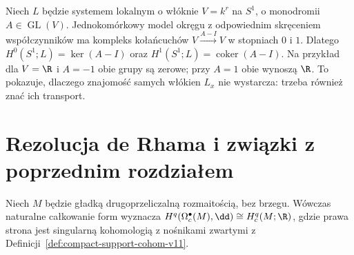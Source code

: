 \begin{przyklad}
Niech $L$ będzie systemem lokalnym o włóknie $V=k^r$
na $S^1$, o monodromii $A\in\operatorname{GL}(V)$.
Jednokomórkowy model okręgu z odpowiednim skręceniem
współczynników ma kompleks kołańcuchów
$V\xrightarrow{A-I}V$ w stopniach $0$ i $1$.
Dlatego
$H^0(S^1;L)=\ker(A-I)$ oraz
$H^1(S^1;L)=\operatorname{coker}(A-I)$.
Na przykład dla $V=\R$ i $A=-1$ obie grupy są zerowe;
przy $A=1$ obie wynoszą $\R$.
To pokazuje, dlaczego znajomość samych włókien $L_x$
nie wystarcza: trzeba również znać ich transport.
\end{przyklad}

\section{Rezolucja de Rhama i związki z poprzednim rozdziałem}
\begin{twierdzenie}
\label{thm:de-rham-sheaf-v12}
Niech $M$ będzie gładką drugoprzeliczalną rozmaitością,
bez brzegu. Wówczas naturalne całkowanie form wyznacza
$H^q(\Omega_c^\bullet(M),\dd)\cong H_c^q(M;\R)$,
gdzie prawa strona jest singularną kohomologią z nośnikami
zwartymi z Definicji~\ref{def:compact-support-cohom-v11}.
\end{twierdzenie}
